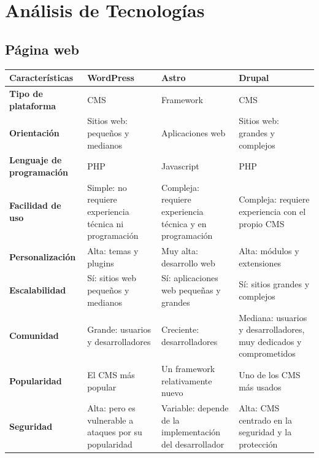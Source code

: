                 \newpage

    
    \section{Análisis de Tecnologías}

        \subsection{Página web}

            \begin{table}[!htbp]
                \centering
                
                \small
                
                \begin{tabular}{|>{\centering\arraybackslash}m{3cm}|>{\centering\arraybackslash}m{3.5cm}|>{\centering\arraybackslash}m{3.5cm}|>{\centering\arraybackslash}m{3.5cm}|}
                    \hline
                    \textbf{Características} & \textbf{WordPress} & \textbf{Astro} & \textbf{Drupal} \\
                    \hline
                    \hline
                    \textbf{Tipo de plataforma} & CMS & Framework & CMS \\
                    \hline
                    \textbf{Orientación} & Sitios web: pequeños y medianos & Aplicaciones web & Sitios web: grandes y complejos\\
                    \hline
                    \textbf{Lenguaje de programación} & PHP & Javascript & PHP \\
                    \hline
                    \textbf{Facilidad de uso} & Simple: no requiere experiencia técnica ni programación & Compleja: requiere experiencia técnica y en programación & Compleja: requiere experiencia con el propio CMS \\
                    \hline
                    \textbf{Personalización} & Alta: temas y plugins & Muy alta: desarrollo web & Alta: módulos y extensiones \\
                    \hline
                    \textbf{Escalabilidad} & Sí: sitios web pequeños y medianos & Sí: aplicaciones web pequeñas y grandes & Sí: sitios grandes y complejos \\
                    \hline
                    \textbf{Comunidad} & Grande: usuarios y desarrolladores & Creciente: desarrolladores & Mediana: usuarios y desarrolladores, muy dedicados y comprometidos \\
                    \hline
                    \textbf{Popularidad} & El CMS más popular & Un framework relativamente nuevo & Uno de los CMS más usados \\
                    \hline
                    \textbf{Seguridad} & Alta: pero es vulnerable a ataques por su popularidad & Variable: depende de la implementación del desarrollador & Alta: CMS centrado en la seguridad y la protección \\
                    \hline
                \end{tabular}
                

\end{table}
